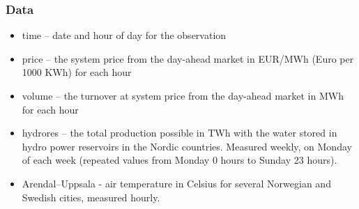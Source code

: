 \documentclass[12pt,a4paper]{article}
\begin{document}
\subsubsection*{Data}
\begin{itemize}
 \item time -- date and hour of day for the observation
 \item price -- the system price from the day-ahead market in EUR/MWh (Euro per 1000 KWh) for each hour
 \item volume -- the turnover at system price from the day-ahead market in MWh for each hour
 \item hydrores -- the total production possible in TWh with the water stored in hydro power reservoirs in the Nordic countries. Measured weekly, on Monday of each week (repeated values from Monday 0 hours to Sunday 23 hours).
 \item Arendal--Uppsala - air temperature in Celsius for several Norwegian and Swedish cities, measured hourly.
\end{itemize}
\end{document}
